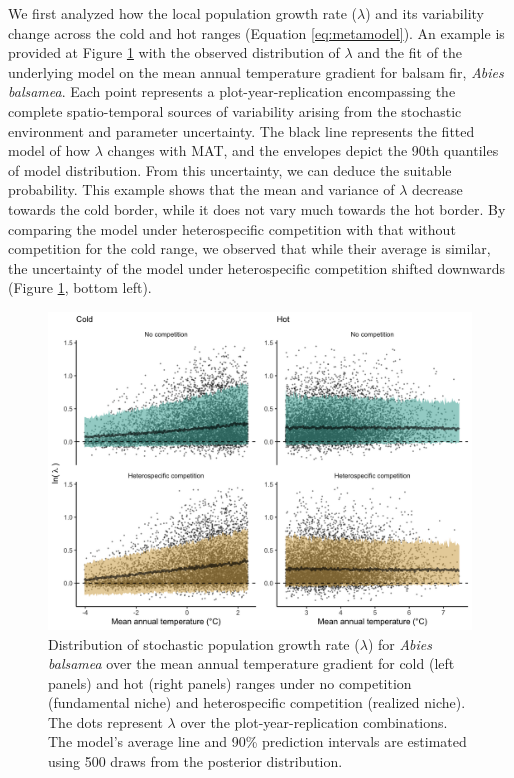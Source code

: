We first analyzed how the local population growth rate (\(\lambda\)) and
its variability change across the cold and hot ranges (Equation
\ref{eq:metamodel}). An example is provided at Figure
\ref{fig:res_example} with the observed distribution of \(\lambda\) and
the fit of the underlying model on the mean annual temperature gradient
for balsam fir, \emph{Abies balsamea}. Each point represents a
plot-year-replication encompassing the complete spatio-temporal sources
of variability arising from the stochastic environment and parameter
uncertainty. The black line represents the fitted model of how
\(\lambda\) changes with MAT, and the envelopes depict the 90th
quantiles of model distribution. From this uncertainty, we can deduce
the suitable probability. This example shows that the mean and variance
of \(\lambda\) decrease towards the cold border, while it does not vary
much towards the hot border. By comparing the model under heterospecific
competition with that without competition for the cold range, we
observed that while their average is similar, the uncertainty of the
model under heterospecific competition shifted downwards (Figure
\ref{fig:res_example}, bottom left).

\hypertarget{fig:res_example}{%
\begin{figure}
\centering
\includegraphics[width=1\textwidth,height=\textheight]{manuscript/figs/fig-res_example-1.png}
\caption[{Distribution of stochastic population growth rate
(\(\lambda\)) for \emph{Abies balsamea} over the mean annual temperature
gradient for different conditions.}]{Distribution of stochastic
population growth rate (\(\lambda\)) for \emph{Abies balsamea} over the
mean annual temperature gradient for cold (left panels) and hot (right
panels) ranges under no competition (fundamental niche) and
heterospecific competition (realized niche). The dots represent
\(\lambda\) over the plot-year-replication combinations. The model's
average line and 90\% prediction intervals are estimated using 500 draws
from the posterior distribution.}
\label{fig:res_example}
\end{figure}
}

